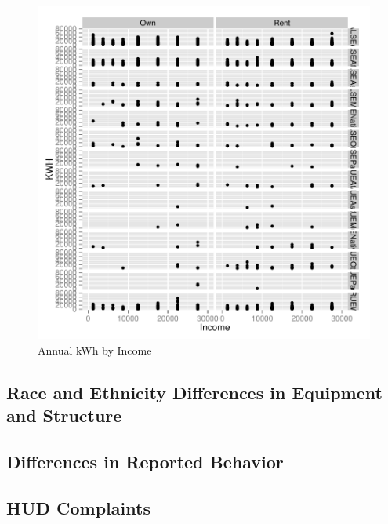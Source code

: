 \documentclass{article}
\begin{document}
\begin{figure}
\begin{center}
\caption{Annual kWh by Income}
\label{fig:kWhbyIncome}
\includegraphics{DraftEdwardsWoods-005}
\end{center}
\end{figure}



  \subsection{Race and Ethnicity Differences in Equipment and Structure}
  
  
  
  \subsection{Differences in Reported Behavior}
  
  \subsection{HUD Complaints}
  
\end{document}
